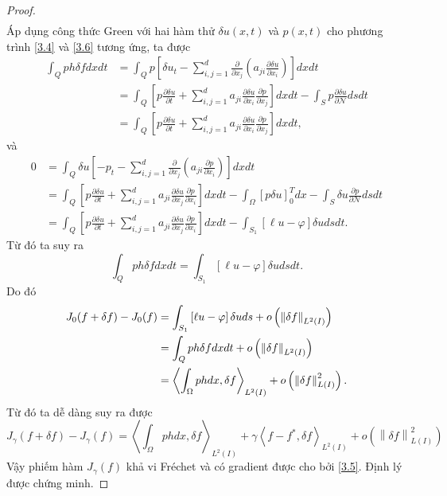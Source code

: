 \documentclass[]{article}
\begin{document}
\begin{proof}
\begin{align*}
	\end{align*}
	Áp dụng công thức Green với hai hàm  thử $\delta u(x, t)$ và $p(x, t)$ cho phương trình \eqref{3.4} và \eqref{3.6} tương ứng, ta được
	\begin{align*}
		\int_Q ph\delta fdxdt&=\int_Q p\left[\delta u_t-\sum_{i, j=1}^{d}\frac{\partial}{\partial x_j}\left(a_{ji}\frac{\partial \delta u}{\partial x_i}\right)\right]dxdt\\
		&=\int_Q\left[p\frac{\partial \delta u}{\partial t}+\sum_{i,j=1}^{d}a_{ji}\frac{\partial \delta u}{\partial x_i}\frac{\partial p}{\partial x_j}\right]dxdt-\int_S p\frac{\partial \delta u}{\partial \mathcal{N}}dsdt\\
		&=\int_Q\left[p\frac{\partial \delta u}{\partial t}+\sum_{i,j=1}^{d}a_{ji}\frac{\partial \delta u}{\partial x_i}\frac{\partial p}{\partial x_j}\right]dxdt,
	\end{align*}
	và
	\begin{align*}
		0&=\int_{Q}\delta u\left[-p_t-\sum_{i, j=1}^{d}\frac{\partial}{\partial x_j}\left(a_{ji}\frac{\partial p}{\partial x_i}\right)\right]dxdt\\
		&=\int_Q\left[p\frac{\partial \delta u}{\partial t}+\sum_{i,j=1}^{d}a_{ji}\frac{\partial \delta u}{\partial x_j}\frac{\partial p}{\partial x_i}\right]dxdt-\int_\Omega \left[p\delta u\right]_0^Tdx-\int_S\delta u \frac{\partial p}{\partial \mathcal{N}}dsdt\\
		&=\int_Q\left[p\frac{\partial \delta u}{\partial t}+\sum_{i,j=1}^{d}a_{ji}\frac{\partial \delta u}{\partial x_j}\frac{\partial p}{\partial x_i}\right]dxdt-\int_{S_1}\left[\ell u-\varphi\right]\delta udsdt.
	\end{align*}
	Từ đó ta suy ra
	$$\int_Q ph\delta fdxdt=\int_{S_1}\left[\ell u-\varphi\right]\delta udsdt.$$
	Do đó
	\begin{align}
		J_0(f+\delta f)-J_0(f)&=\int_{S_1}\left[\ell u-\varphi\right]\delta uds+o\left(\left\|\delta f\right\|_{L^2(I)}\right)\notag\\
		&=\int_Q ph\delta fdxdt+o\left(\left\|\delta f\right\|_{L^2(I)}\right)\notag\\
		&=\left\langle \int_\Omega phdx,\delta f \right\rangle_{L^2(I)}+o\left(\left\|\delta f\right\|^2_{L(I)}\right).\label{3.7}
	\end{align}
	Từ đó ta dễ dàng suy ra được
	$$J_\gamma(f+\delta f)-J_\gamma(f)=\left\langle \int_\Omega phdx,\delta f \right\rangle_{L^2(I)}+\gamma\left\langle f-f^*,\delta f \right\rangle_{L^2(I)}+o\left(\left\|\delta f\right\|^2_{L(I)}\right)$$
	Vậy phiếm hàm $J_\gamma(f)$ khả vi Fréchet và có gradient được cho bởi \eqref{3.5}. Định lý được chứng minh.
\end{proof}
\end{document}
